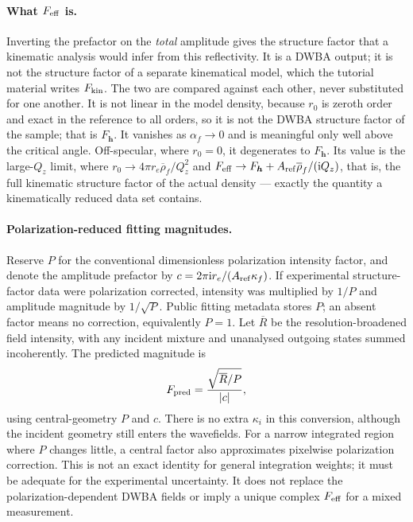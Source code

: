 \paragraph{What $F_{\rm eff}$ is.}  Inverting the prefactor on the
\emph{total} amplitude gives the structure factor that a kinematic analysis
would infer from this reflectivity.  It is a DWBA output; it is not the
structure factor of a separate kinematical model, which the tutorial material
writes $F_{\rm kin}$.  The two are compared against each other, never
substituted for one another.  It is not linear in the model density,
because $r_0$ is zeroth order and exact in the reference to all orders, so it
is not the DWBA structure factor of the sample; that is $F_{\bm h}$.  It
vanishes as $\alpha_f\to0$ and is meaningful only well above the critical
angle.  Off-specular, where $r_0=0$, it degenerates to $F_{\bm h}$.  Its value
is the large-$Q_z$ limit, where $r_0\to4\pi r_e\overline\rho_f/Q_z^2$ and
$F_{\rm eff}\to F_{\bm h}+A_{\rm ref}\overline\rho_f/(\mathrm{i} Q_z)$, that is, the
full kinematic structure factor of the actual density --- exactly the quantity
a kinematically reduced data set contains.

\paragraph{Polarization-reduced fitting magnitudes.}
Reserve $P$ for the conventional dimensionless polarization intensity factor,
and denote the amplitude prefactor by
$c=2\pi\mathrm{i} r_e/(A_{\rm ref}\kappa_f)$.  If experimental structure-factor
data were polarization corrected, intensity was multiplied by $1/P$ and
amplitude magnitude by $1/\sqrt{P}$.  Public fitting metadata stores $P$;
an absent factor means no correction, equivalently $P=1$.  Let $\overline R$
be the resolution-broadened field intensity, with any incident mixture and
unanalysed outgoing states summed incoherently.  The predicted magnitude is
\[
  F_{\rm pred}=\frac{\sqrt{\overline R/P}}{|c|},
\]
using central-geometry $P$ and $c$.  There is no extra $\kappa_i$ in this
conversion, although the incident geometry still enters the wavefields.
For a narrow integrated region where $P$ changes little, a central factor
also approximates pixelwise polarization correction.  This is not an exact
identity for general integration weights; it must be adequate for the
experimental uncertainty.  It does not replace the polarization-dependent
DWBA fields or imply a unique complex $F_{\rm eff}$ for a mixed measurement.

